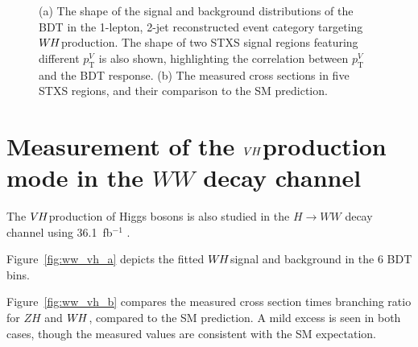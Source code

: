 \documentclass{moriond}
\def\wh{\texorpdfstring{\ensuremath{W\kern -0.1em H}\xspace}{WH\xspace}}
\def\vh{\texorpdfstring{\ensuremath{V\kern -0.1em H}\xspace}{VH\xspace}}
\begin{document}
\begin{figure}[!htbp]
  \centering
  \caption{
    (a) The shape of the signal and background  distributions of the BDT in the 1-lepton, 2-jet
    reconstructed event category targeting \wh production. The shape of two STXS signal regions
    featuring different $p^{V}_\mathrm{T}$ is also shown, highlighting the correlation between
    $p^{V}_\mathrm{T}$ and the BDT response.
    (b) The measured cross sections in five STXS regions, and their comparison to the SM prediction.
  }
  \label{fig:vh_bb}
\end{figure}

\section{Measurement of the \vh production mode in the $WW$ decay channel} \label{sec:vh_ww}

The \vh production of Higgs bosons is also studied in the $H{\rightarrow}WW$ decay channel
 using 36.1~fb$^{-1}$ \cite{HIGG-2017-14}.

Figure~\ref{fig:ww_vh_a} depicts the fitted \wh signal and background in the 6 BDT bins.

Figure~\ref{fig:ww_vh_b} compares the measured cross section times branching ratio for $ZH$ and \wh,
compared to the SM prediction. A mild excess is seen in both cases, though the measured values are
consistent with the SM expectation.
\end{document}

